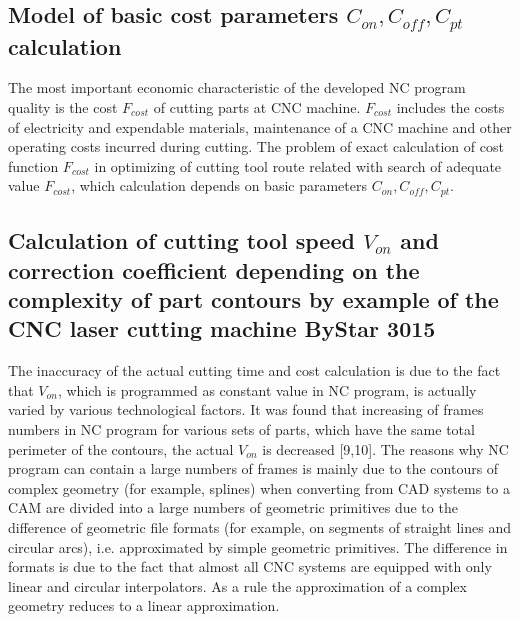 \documentclass[runningheads]{llncs}
\begin{document}
\subsection{Model of basic cost parameters  $C_{on}, C_{off}, C_{pt}$ calculation}

The most important economic characteristic of the developed NC program quality is the cost $F_{cost}$
of cutting parts at CNC machine.
$F_{cost}$ includes the costs of electricity and expendable materials,
maintenance of a CNC machine and other operating costs incurred during cutting.
The problem of exact calculation of cost function $F_{cost}$
in optimizing of cutting tool route related with search of adequate value  $F_{cost}$,
which calculation depends on basic parameters  $C_{on}, C_{off}, C_{pt}$.

\subsection{Calculation of cutting tool speed $V_{on}$
and correction coefficient depending on the complexity of
part contours by example of the CNC laser cutting machine ByStar 3015}

The inaccuracy of the actual cutting time and cost calculation is due to the fact that $V_{on}$,
which is programmed as constant value in NC program,
is actually varied by various technological factors.
It was found that increasing of frames numbers in NC program
for various sets of parts,
which have the same total perimeter of the contours,
the actual $V_{on}$ is decreased [9,10].
The reasons why NC program can contain a large numbers of frames
is mainly due to the contours of complex geometry (for example, splines)
when converting from CAD systems to a CAM
are divided into a large numbers of geometric primitives
due to the difference of geometric file formats
(for example, on segments of straight lines and circular arcs),
i.e. approximated by simple geometric primitives.
The difference in formats is due to the fact that
almost all CNC systems are equipped with only linear and circular interpolators.
As a rule the approximation of a complex geometry reduces to a linear approximation.
\end{document}
